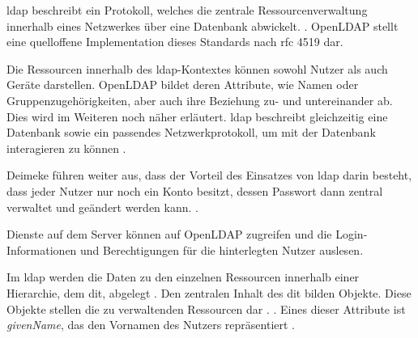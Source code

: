 \ac{ldap} beschreibt  ein Protokoll, welches die zentrale Ressourcenverwaltung innerhalb eines Netzwerkes über eine Datenbank abwickelt.
 \citep[][611]{Deimeke2019}. OpenLDAP stellt eine quelloffene Implementation dieses Standards nach \ac{rfc} 4519 dar.

Die Ressourcen innerhalb des \ac{ldap}-Kontextes können sowohl Nutzer als auch Geräte darstellen. OpenLDAP bildet deren Attribute, wie Namen oder Gruppenzugehörigkeiten, aber auch ihre Beziehung zu- und untereinander ab. Dies wird im Weiteren noch näher erläutert. 
\ac{ldap} beschreibt gleichzeitig eine Datenbank sowie ein passendes Netzwerkprotokoll, um mit der Datenbank interagieren zu können \citep[vgl.][3]{Gietz}.

Deimeke \ua führen weiter aus, dass der Vorteil des Einsatzes von \ac{ldap} darin besteht, dass jeder Nutzer nur noch ein Konto besitzt, dessen Passwort dann zentral verwaltet und geändert werden kann. 
 \citep[][611]{Deimeke2019}.

Dienste auf dem Server können auf OpenLDAP zugreifen und die Login-Informationen und Berechtigungen für die hinterlegten Nutzer auslesen.

Im \ac{ldap} werden die Daten zu den einzelnen Ressourcen innerhalb einer Hierarchie, dem \ac{dit}, abgelegt \citep[vgl.][7]{rfc4512}. 
Den zentralen Inhalt des \ac{dit} bilden Objekte. Diese Objekte stellen die zu verwaltenden Ressourcen dar \citep[vgl.][614]{Deimeke2019}. 
 \citep[][614]{Deimeke2019}. 
Eines dieser Attribute ist \zb \textit{givenName}, das den Vornamen des Nutzers repräsentiert \citep[vgl.][9]{rfc4519}.


